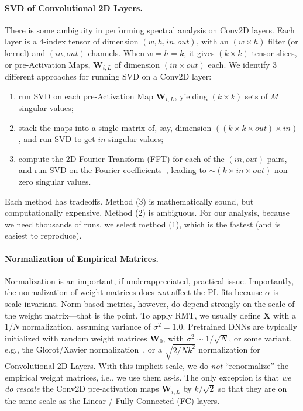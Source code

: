 \paragraph{SVD of Convolutional 2D Layers.}

There is some ambiguity in performing spectral analysis on Conv2D layers.  
Each layer is a 4-index tensor of dimension $(w,h,in,out)$, with an $(w\times h)$ filter (or kernel) and $(in, out)$
channels. When $w=h=k$, it gives $(k\times k)$ tensor slices, or pre-Activation Maps, $\mathbf{W}_{i,L}$ of dimension $(in\times out)$ each. 
%
We identify 3 different approaches for running SVD on a Conv2D layer:
\begin{enumerate}
\item run SVD on each pre-Activation Map $\mathbf{W}_{i,L}$, yielding $(k\times k)$ sets of $M$ singular values;
\item stack the maps into a single matrix of, say, dimension $((k\times k\times out)\times in)$, and run SVD to get $in$ singular values;
\item compute the 2D Fourier Transform (FFT) for each of the $(in, out)$ pairs, and run SVD on the Fourier coefficients~\cite{CNNSVD}, leading to $\sim(k\times in\times out)$ non-zero singular values.
\end{enumerate}
Each method has tradeoffs.  
Method (3) is mathematically sound, but computationally expensive. Method (2) is ambiguous.
For our analysis, because we need thousands of runs, we select method (1), which is the fastest (and is easiest to reproduce).


\paragraph{Normalization of Empirical Matrices.}  

Normalization is an important, if underappreciated, practical issue.
Importantly, the normalization of weight matrices does \emph{not} affect the PL fits because $\alpha$ is scale-invariant.
Norm-based metrics, however, do depend strongly on the scale of the weight matrix---that is the point.
To apply RMT, we usually define $\mathbf{X}$ with a $1/N$ normalization, assuming variance of $\sigma^{2}=1.0$.
Pretrained DNNs are typically initialized with random weight matrices $\mathbf{W}_{0}$, with $\sigma^{2}\sim 1/\sqrt{N}$, or some variant, e.g., the Glorot/Xavier normalization~\cite{GloBen10}, or a $\sqrt{2/Nk^2}$ normalization for Convolutional 2D Layers. With this implicit scale, we do \emph{not} ``renormalize'' the empirical weight matrices, i.e., we use them as-is.
The only exception is that \emph{we do rescale} the Conv2D pre-activation maps $\mathbf{W}_{i,L}$ by $k/\sqrt{2}$ so that they are on the same scale as the Linear / Fully Connected (FC) layers.


